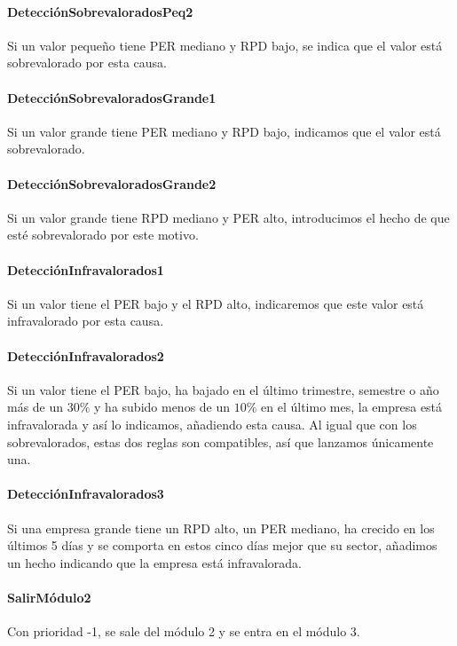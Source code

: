 \documentclass[11pt,leqno]{article}
\theoremstyle{definition_wo_parentheses}
\theoremstyle{plain}
\theoremstyle{remark}
\begin{document}
\paragraph{DetecciónSobrevaloradosPeq2} Si un valor pequeño tiene PER mediano y RPD bajo, se indica que el valor está sobrevalorado por esta causa.

\paragraph{DetecciónSobrevaloradosGrande1} Si un valor grande tiene PER mediano y RPD bajo, indicamos que el valor está sobrevalorado.

\paragraph{DetecciónSobrevaloradosGrande2} Si un valor grande tiene RPD mediano y PER alto, introducimos el hecho de que esté sobrevalorado por este motivo.

\paragraph{DetecciónInfravalorados1} Si un valor tiene el PER bajo y el RPD alto, indicaremos que este valor está infravalorado por esta causa. 

\paragraph{DetecciónInfravalorados2} Si un valor tiene el PER bajo, ha bajado en el último trimestre, semestre o año más de un 30$\%$ y ha subido menos de un $10\%$ en el último mes, la empresa está infravalorada y así lo indicamos, añadiendo esta causa. Al igual que con los sobrevalorados, estas dos reglas son compatibles, así que lanzamos únicamente una.

\paragraph{DetecciónInfravalorados3} Si una empresa grande tiene un RPD alto, un PER mediano, ha crecido en los últimos 5 días y se comporta en estos cinco días mejor que su sector, añadimos un hecho indicando que la empresa está infravalorada.

\paragraph{SalirMódulo2} Con prioridad -1, se sale del módulo 2 y se entra en el módulo 3.
\end{document}
